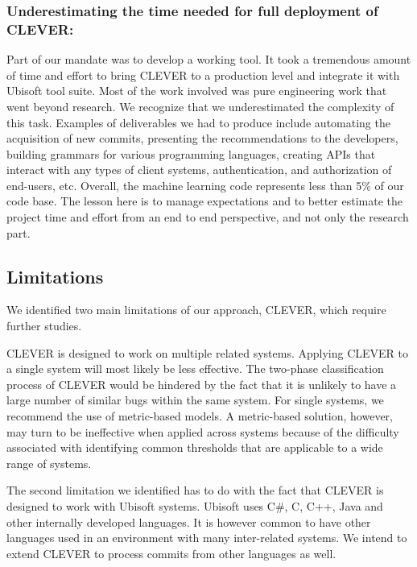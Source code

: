 \documentclass[sigconf]{acmart}
\begin{document}
\subsubsection{Underestimating the time needed for full deployment of
CLEVER:}\label{underestimating-the-time-needed-for-full-deployment-of-clever}

Part of our mandate was to develop a working tool. It took a tremendous
amount of time and effort to bring CLEVER to a production level and
integrate it with Ubisoft tool suite. Most of the work involved was pure
engineering work that went beyond research. We recognize that we
underestimated the complexity of this task. Examples of deliverables we
had to produce include automating the acquisition of new commits,
presenting the recommendations to the developers, building grammars for
various programming languages, creating APIs that interact with any
types of client systems, authentication, and authorization of end-users,
etc. Overall, the machine learning code represents less than 5\% of our
code base. The lesson here is to manage expectations and to better
estimate the project time and effort from an end to end perspective, and
not only the research part.

\subsection{Limitations}\label{limitations}

We identified two main limitations of our approach, CLEVER, which
require further studies.

CLEVER is designed to work on multiple related systems. Applying CLEVER
to a single system will most likely be less effective. The two-phase
classification process of CLEVER would be hindered by the fact that it
is unlikely to have a large number of similar bugs within the same
system. For single systems, we recommend the use of metric-based models.
A metric-based solution, however, may turn to be ineffective when
applied across systems because of the difficulty associated with
identifying common thresholds that are applicable to a wide range of
systems.

The second limitation we identified has to do with the fact that CLEVER
is designed to work with Ubisoft systems. Ubisoft uses C\#, C, C++, Java
and other internally developed languages. It is however common to have
other languages used in an environment with many inter-related systems.
We intend to extend CLEVER to process commits from other languages as
well.
\end{document}
